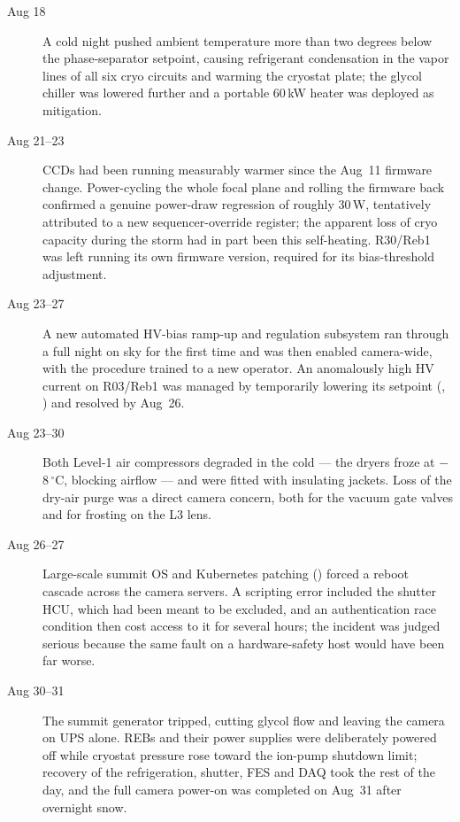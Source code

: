 \begin{description}
\item[Aug 18] A cold night pushed ambient temperature more than two
  degrees below the phase-separator setpoint, causing refrigerant
  condensation in the vapor lines of all six cryo circuits and
  warming the cryostat plate; the glycol chiller was lowered further
  and a portable 60\,kW heater was deployed as mitigation.

\item[Aug 21--23] CCDs had been running measurably warmer since the
  Aug~11 firmware change.  Power-cycling the whole focal plane and
  rolling the firmware back confirmed a genuine power-draw regression
  of roughly 30\,W, tentatively attributed to a new sequencer-override
  register; the apparent loss of cryo capacity during the storm had in
  part been this self-heating.  R30/Reb1 was left running its own
  firmware version, required for its bias-threshold adjustment.

\item[Aug 23--27] A new automated HV-bias ramp-up and regulation
  subsystem ran through a full night on sky for the first time and was
  then enabled camera-wide, with the procedure trained to a new
  operator.  An anomalously high HV current on R03/Reb1 was managed by
  temporarily lowering its setpoint (, ) and
  resolved by Aug~26.

\item[Aug 23--30] Both Level-1 air compressors degraded in the cold
  --- the dryers froze at $-$8\,$^{\circ}$C, blocking airflow --- and
  were fitted with insulating jackets.  Loss of the dry-air purge was
  a direct camera concern, both for the vacuum gate valves and for
  frosting on the L3 lens.

\item[Aug 26--27] Large-scale summit OS and Kubernetes patching
  () forced a reboot cascade across the camera servers.  A
  scripting error included the shutter HCU, which had been meant to be
  excluded, and an authentication race condition then cost access to
  it for several hours; the incident was judged serious because the
  same fault on a hardware-safety host would have been far worse.

\item[Aug 30--31] The summit generator tripped, cutting glycol flow
  and leaving the camera on UPS alone.  REBs and their power supplies
  were deliberately powered off while cryostat pressure rose toward
  the ion-pump shutdown limit; recovery of the refrigeration, shutter,
  FES and DAQ took the rest of the day, and the full camera power-on
  was completed on Aug~31 after overnight snow.
\end{description}

